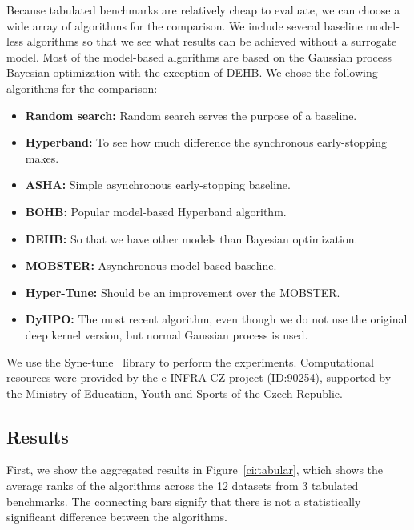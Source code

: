 Because tabulated benchmarks are relatively cheap to evaluate, we can choose a wide array of algorithms for the comparison. We include several baseline model-less algorithms so that we see what results can be achieved without a surrogate model. Most of the model-based algorithms are based on the Gaussian process Bayesian optimization with the exception of DEHB.\@ {} We chose the following algorithms for the comparison:
\begin{itemize}
\item \textbf{Random search:} Random search serves the purpose of a baseline.
\item \textbf{Hyperband:} To see how much difference the synchronous early-stopping makes.
\item \textbf{ASHA:} Simple asynchronous early-stopping baseline.
\item \textbf{BOHB:} Popular model-based Hyperband algorithm.
\item \textbf{DEHB:} So that we have other models than Bayesian optimization.
\item \textbf{MOBSTER:} Asynchronous model-based baseline.
\item \textbf{Hyper-Tune:} Should be an improvement over the MOBSTER.
\item \textbf{DyHPO:} The most recent algorithm, even though we do not use the original deep kernel version, but normal Gaussian process is used.
\end{itemize}


We use the Syne-tune~\cite{salinas2022syne} library to perform the experiments. Computational resources were provided by the e-INFRA CZ project (ID:90254),
supported by the Ministry of Education, Youth and Sports of the Czech Republic.

\subsection{Results}
First, we show the aggregated results in Figure~\ref{ci:tabular}, which shows the average ranks of the algorithms across the 12 datasets from 3 tabulated benchmarks. The connecting bars signify that there is not a statistically significant difference between the algorithms. 

